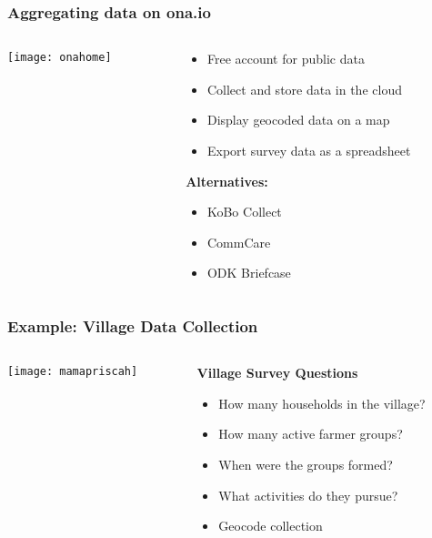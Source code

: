 \documentclass{beamer}
\begin{document}
\begin{frame}
\frametitle{Aggregating data on ona.io}
 \begin{columns}
  \begin{column}[T]{0.6\textwidth}
   \texttt{[image: onahome]}
  \end{column}  
  \begin{column}[T]{0.4\textwidth}
  
   \begin{itemize}
    \item Free account for public data
	\item Collect and store data in the cloud
	\item Display geocoded data on a map
	\item Export survey data as a spreadsheet
   \end{itemize}
   
    \textbf{Alternatives:}
    \begin{itemize}
	 \item KoBo Collect
	 \item CommCare
	 \item ODK Briefcase 
	\end{itemize}
	
  \end{column}
 \end{columns}
\end{frame}

\begin{frame}
\frametitle{Example: Village Data Collection}
\begin{columns}
 \begin{column}[T]{0.6\textwidth}
  \texttt{[image: mamapriscah]}
 \end{column}
 \begin{column}[T]{0.4\textwidth}
  \textbf{Village Survey Questions}
  \begin{itemize}
   \item How many households in the village?
   \item How many active farmer groups?
   \item When were the groups formed?
   \item What activities do they pursue?
   \item Geocode collection
  \end{itemize}
 \end{column}
\end{columns}

\end{frame}
\end{document}
